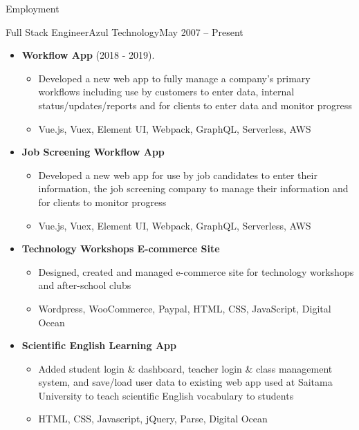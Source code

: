 \documentclass[calibri]{fullstack}
\begin{document}
	\makeheader

	\begin{cvsection}{Employment}
		\begin{cvsubsection}{Full Stack Engineer}{Azul Technology}{May 2007 -- Present}
			\begin{itemize}
				\item \textbf{Workflow App} (2018 - 2019).
				\begin{itemize}
					\item Developed a new web app to fully manage a company's primary workflows including use by customers to enter data, internal status/updates/reports and for clients to enter data and monitor progress
					\item Vue.js, Vuex, Element UI, Webpack, GraphQL, Serverless, AWS
				\end{itemize}

				\item \textbf{Job Screening Workflow App} %
				\begin{itemize}
					\item Developed a new web app for use by job candidates to enter their information, the job screening company to manage their information and for clients to monitor progress
					\item Vue.js, Vuex, Element UI, Webpack, GraphQL, Serverless, AWS
				\end{itemize}

				\item \textbf{Technology Workshops E-commerce Site} %
				\begin{itemize}
					\item Designed, created and managed e-commerce site for technology workshops and after-school clubs
					\item Wordpress, WooCommerce, Paypal, HTML, CSS, JavaScript, Digital Ocean
				\end{itemize}

				\item \textbf{Scientific English Learning App} %
				\begin{itemize}
					\item Added student login \& dashboard, teacher login \& class management system, and save/load user data to existing web app used at Saitama University to teach scientific English vocabulary to students
					\item HTML, CSS, Javascript, jQuery, Parse, Digital Ocean
				\end{itemize}


\end{itemize}
\end{cvsubsection}
\end{cvsection}
\end{document}
